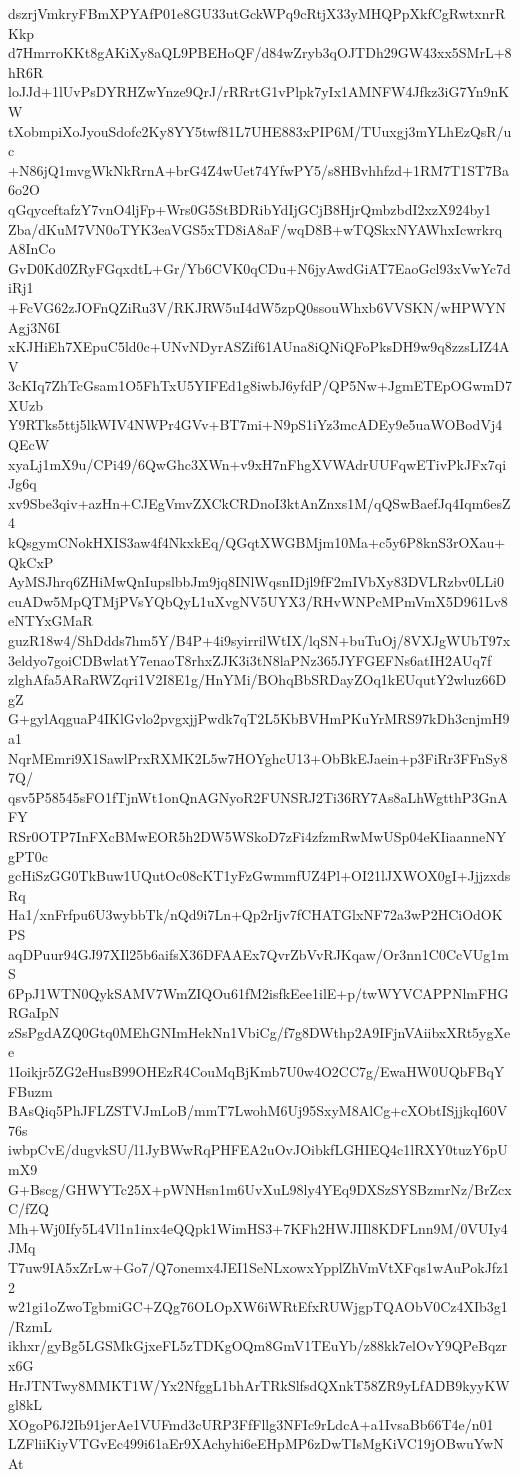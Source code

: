 dszrjVmkryFBmXPYAfP01e8GU33utGckWPq9cRtjX33yMHQPpXkfCgRwtxnrRKkp
d7HmrroKKt8gAKiXy8aQL9PBEHoQF/d84wZryb3qOJTDh29GW43xx5SMrL+8hR6R
loJJd+1lUvPsDYRHZwYnze9QrJ/rRRrtG1vPlpk7yIx1AMNFW4Jfkz3iG7Yn9nKW
tXobmpiXoJyouSdofc2Ky8YY5twf81L7UHE883xPIP6M/TUuxgj3mYLhEzQsR/uc
+N86jQ1mvgWkNkRrnA+brG4Z4wUet74YfwPY5/s8HBvhhfzd+1RM7T1ST7Ba6o2O
qGqyceftafzY7vnO4ljFp+Wrs0G5StBDRibYdIjGCjB8HjrQmbzbdI2xzX924by1
Zba/dKuM7VN0oTYK3eaVGS5xTD8iA8aF/wqD8B+wTQSkxNYAWhxIcwrkrqA8InCo
GvD0Kd0ZRyFGqxdtL+Gr/Yb6CVK0qCDu+N6jyAwdGiAT7EaoGcl93xVwYc7diRj1
+FcVG62zJOFnQZiRu3V/RKJRW5uI4dW5zpQ0ssouWhxb6VVSKN/wHPWYNAgj3N6I
xKJHiEh7XEpuC5ld0c+UNvNDyrASZif61AUna8iQNiQFoPksDH9w9q8zzsLIZ4AV
3cKIq7ZhTcGsam1O5FhTxU5YIFEd1g8iwbJ6yfdP/QP5Nw+JgmETEpOGwmD7XUzb
Y9RTks5ttj5lkWIV4NWPr4GVv+BT7mi+N9pS1iYz3mcADEy9e5uaWOBodVj4QEcW
xyaLj1mX9u/CPi49/6QwGhc3XWn+v9xH7nFhgXVWAdrUUFqwETivPkJFx7qiJg6q
xv9Sbe3qiv+azHn+CJEgVmvZXCkCRDnoI3ktAnZnxs1M/qQSwBaefJq4Iqm6esZ4
kQsgymCNokHXIS3aw4f4NkxkEq/QGqtXWGBMjm10Ma+c5y6P8knS3rOXau+QkCxP
AyMSJhrq6ZHiMwQnIupslbbJm9jq8INlWqsnIDjl9fF2mIVbXy83DVLRzbv0LLi0
cuADw5MpQTMjPVsYQbQyL1uXvgNV5UYX3/RHvWNPcMPmVmX5D961Lv8eNTYxGMaR
guzR18w4/ShDdds7hm5Y/B4P+4i9syirrilWtIX/lqSN+buTuOj/8VXJgWUbT97x
3eldyo7goiCDBwlatY7enaoT8rhxZJK3i3tN8laPNz365JYFGEFNs6atIH2AUq7f
zlghAfa5ARaRWZqri1V2I8E1g/HnYMi/BOhqBbSRDayZOq1kEUqutY2wluz66DgZ
G+gylAqguaP4IKlGvlo2pvgxjjPwdk7qT2L5KbBVHmPKuYrMRS97kDh3cnjmH9a1
NqrMEmri9X1SawlPrxRXMK2L5w7HOYghcU13+ObBkEJaein+p3FiRr3FFnSy87Q/
qsv5P58545sFO1fTjnWt1onQnAGNyoR2FUNSRJ2Ti36RY7As8aLhWgtthP3GnAFY
RSr0OTP7InFXcBMwEOR5h2DW5WSkoD7zFi4zfzmRwMwUSp04eKIiaanneNYgPT0c
gcHiSzGG0TkBuw1UQutOc08cKT1yFzGwmmfUZ4Pl+OI21lJXWOX0gI+JjjzxdsRq
Ha1/xnFrfpu6U3wybbTk/nQd9i7Ln+Qp2rIjv7fCHATGlxNF72a3wP2HCiOdOKPS
aqDPuur94GJ97XIl25b6aifsX36DFAAEx7QvrZbVvRJKqaw/Or3nn1C0CcVUg1mS
6PpJ1WTN0QykSAMV7WmZIQOu61fM2isfkEee1ilE+p/twWYVCAPPNlmFHGRGaIpN
zSsPgdAZQ0Gtq0MEhGNImHekNn1VbiCg/f7g8DWthp2A9IFjnVAiibxXRt5ygXee
1Ioikjr5ZG2eHusB99OHEzR4CouMqBjKmb7U0w4O2CC7g/EwaHW0UQbFBqYFBuzm
BAsQiq5PhJFLZSTVJmLoB/mmT7LwohM6Uj95SxyM8AlCg+cXObtISjjkqI60V76s
iwbpCvE/dugvkSU/l1JyBWwRqPHFEA2uOvJOibkfLGHIEQ4c1lRXY0tuzY6pUmX9
G+Bscg/GHWYTc25X+pWNHsn1m6UvXuL98ly4YEq9DXSzSYSBzmrNz/BrZcxC/fZQ
Mh+Wj0Ify5L4Vl1n1inx4eQQpk1WimHS3+7KFh2HWJIIl8KDFLnn9M/0VUIy4JMq
T7uw9IA5xZrLw+Go7/Q7onemx4JEI1SeNLxowxYpplZhVmVtXFqs1wAuPokJfz12
w21gi1oZwoTgbmiGC+ZQg76OLOpXW6iWRtEfxRUWjgpTQAObV0Cz4XIb3g1/RzmL
ikhxr/gyBg5LGSMkGjxeFL5zTDKgOQm8GmV1TEuYb/z88kk7elOvY9QPeBqzrx6G
HrJTNTwy8MMKT1W/Yx2NfggL1bhArTRkSlfsdQXnkT58ZR9yLfADB9kyyKWgl8kL
XOgoP6J2Ib91jerAe1VUFmd3cURP3FfFllg3NFIc9rLdcA+a1IvsaBb66T4e/n01
LZFliiKiyVTGvEc499i61aEr9XAchyhi6eEHpMP6zDwTIsMgKiVC19jOBwuYwNAt
